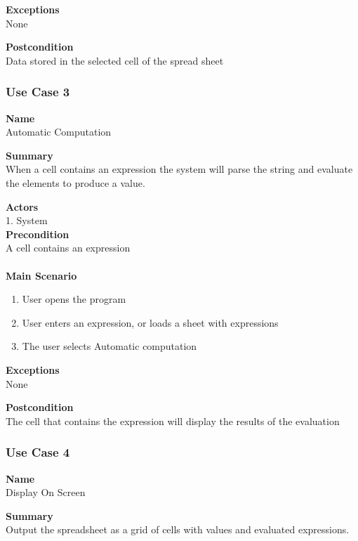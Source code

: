 \documentclass[12pt]{article}
\begin{document}
\noindent
{\bf Exceptions}\\
None

\noindent
{\bf Postcondition}\\
Data stored in the selected cell of the spread sheet

\clearpage

\subsubsection{Use Case 3} \label{uc:3}

\noindent
{\bf Name}\\
Automatic Computation

\noindent
{\bf Summary}\\
When a cell contains an expression the system will parse the string and evaluate the elements to produce a value.

\noindent
{\bf Actors}\\
1. System\\

\noindent
{\bf Precondition}\\
A cell contains an expression\\
\noindent\\
{\bf Main Scenario}\\
\vspace*{-0.2in}
\begin{enumerate}
\item User opens the program
\item User enters an expression, or loads a sheet with expressions
\item The user selects Automatic computation
\end{enumerate}

\noindent
{\bf Exceptions}\\
None

\noindent
{\bf Postcondition}\\
The cell that contains the expression will display the results of the evaluation

\clearpage

\subsubsection{Use Case 4} \label{uc:4}

\noindent
{\bf Name}\\
Display On Screen

\noindent
{\bf Summary}\\
Output the spreadsheet as a grid of cells with values and evaluated expressions.
\end{document}
